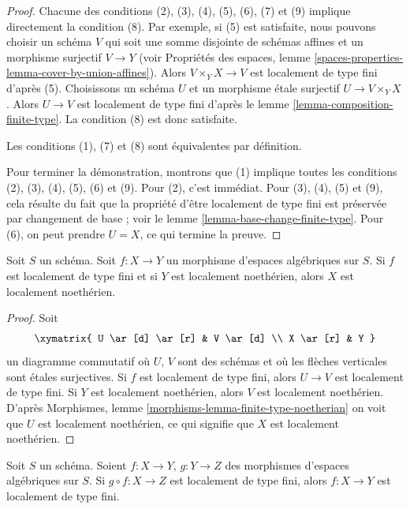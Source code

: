 \begin{proof}
Chacune des conditions (2), (3), (4), (5), (6), (7) et (9)
implique directement la condition (8). Par exemple, si
(5) est satisfaite, nous pouvons choisir un schéma $V$ qui soit une somme
disjointe de schémas affines et un morphisme surjectif $V \to Y$
(voir Propriétés des espaces, lemme
\ref{spaces-properties-lemma-cover-by-union-affines}).
Alors $V \times_Y X \to V$ est localement de type fini d'après (5).
Choisissons un schéma $U$ et un morphisme étale surjectif
$U \to V \times_Y X$. Alors $U \to V$ est localement de type
fini d'après le lemme \ref{lemma-composition-finite-type}.
La condition (8) est donc satisfaite.

\medskip\noindent
Les conditions (1), (7) et (8) sont équivalentes par définition.

\medskip\noindent
Pour terminer la démonstration, montrons que (1) implique toutes les conditions
(2), (3), (4), (5), (6) et (9). Pour (2), c'est immédiat.
Pour (3), (4), (5) et (9), cela résulte du fait que la propriété d'être
localement de type fini est préservée par changement de base ; voir le
lemme \ref{lemma-base-change-finite-type}.
Pour (6), on peut prendre $U = X$, ce qui termine la preuve.
\end{proof}

\begin{lemma}
\label{lemma-locally-finite-type-locally-noetherian}
Soit $S$ un schéma.
Soit $f : X \to Y$ un morphisme d'espaces algébriques sur $S$.
Si $f$ est localement de type fini et si $Y$ est localement noethérien,
alors $X$ est localement noethérien.
\end{lemma}

\begin{proof}
Soit
$$
\xymatrix{
U \ar[d] \ar[r] & V \ar[d] \\
X \ar[r] & Y
}
$$
un diagramme commutatif où $U$, $V$ sont des schémas et où les flèches verticales
sont étales surjectives. Si $f$ est localement de type fini, alors
$U \to V$ est localement de type fini. Si $Y$ est localement noethérien, alors
$V$ est localement noethérien. D'après
Morphismes, lemme \ref{morphisms-lemma-finite-type-noetherian}
on voit que $U$ est localement noethérien, ce qui signifie que $X$ est localement
noethérien.
\end{proof}

\begin{lemma}
\label{lemma-permanence-finite-type}
Soit $S$ un schéma.
Soient $f : X \to Y$, $g : Y \to Z$ des morphismes d'espaces algébriques sur $S$.
Si $g \circ f : X \to Z$ est localement de type fini, alors $f : X \to Y$
est localement de type fini.
\end{lemma}

